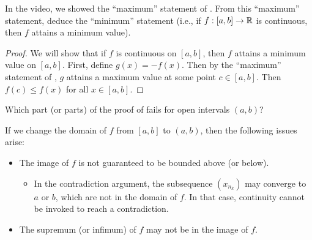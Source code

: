 \begin{problem}
  In the video, we showed the ``maximum'' statement of
  . From this ``maximum'' statement, deduce
  the ``minimum'' statement (i.e., if $f : [a,b] \to \mathbb{R}$ is continuous, then
  $f$ attains a minimum value). 

  \begin{proof}
    We will show that if $f$ is continuous on $[a,b]$, then $f$ attains a minimum
    value on $[a,b]$.
    First, define $g(x) = -f(x)$. Then by the ``maximum'' statement of ,
    $g$ attains a maximum value at some point $c \in [a,b]$. Then $f(c) \leq f(x)$ for all $x \in [a,b]$.
  \end{proof}

\end{problem}

\begin{problem}
  Which part (or parts) of the proof of  fails for open intervals $(a, b)$?
  \vspace{\baselineskip}

  If we change the domain of $f$ from $[a,b]$ to $(a,b)$, then the following issues arise:
  \begin{itemize}
    \item The image of $f$ is not guaranteed to be bounded above (or below).
      \begin{itemize}
        \item In the contradiction argument, the subsequence $(x_{n_{k}})$ may
        converge to $a$ or $b$, which are not in the domain of $f$. In that case,
        continuity cannot be invoked to reach a contradiction.
      \end{itemize}
    \item The supremum (or infimum) of $f$ may not be in the image of $f$.
  \end{itemize}
\end{problem}

